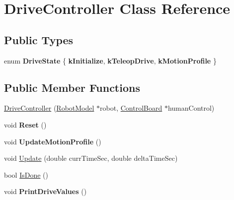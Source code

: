 \hypertarget{class_drive_controller}{}\section{Drive\+Controller Class Reference}
\label{class_drive_controller}
\subsection*{Public Types}
\begin{DoxyCompactItemize}
\item 
\mbox{\label{class_drive_controller_abb183068492c689edb76fe802a4a35ad}} 
enum {\bfseries Drive\+State} \{ {\bfseries k\+Initialize}, 
{\bfseries k\+Teleop\+Drive}, 
{\bfseries k\+Motion\+Profile}
 \}
\end{DoxyCompactItemize}
\subsection*{Public Member Functions}
\begin{DoxyCompactItemize}
\item 
\hyperlink{class_drive_controller_a166bb5ed50199d8482ebbc0e244742a1}{Drive\+Controller} (\hyperlink{class_robot_model}{Robot\+Model} $\ast$robot, \hyperlink{class_control_board}{Control\+Board} $\ast$human\+Control)
\item 
\mbox{\label{class_drive_controller_afb1d02465d9feb19335db06c6d686552}} 
void {\bfseries Reset} ()
\item 
\mbox{\label{class_drive_controller_a80935e19c13c8f9212054af0183e53ad}} 
void {\bfseries Update\+Motion\+Profile} ()
\item 
void \hyperlink{class_drive_controller_aefc9e8cbe2948d2e72987e0a8a2cbf80}{Update} (double curr\+Time\+Sec, double delta\+Time\+Sec)
\item 
bool \hyperlink{class_drive_controller_ae07d828e9b1738bd0baf6dca46e5bd5c}{Is\+Done} ()
\item 
\mbox{\label{class_drive_controller_abbcf50b6d01eda0d1a45131dfeb97db8}} 
void {\bfseries Print\+Drive\+Values} ()
\end{DoxyCompactItemize}

